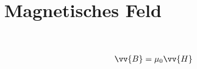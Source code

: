 \section{Magnetisches Feld}
\begin{boxleft}
\\
\end{boxleft}\begin{boxrightshaded}
\begin{align*}
\vv{B}&=\mu_0\vv{H}
\end{align*}
\end{boxrightshaded}

